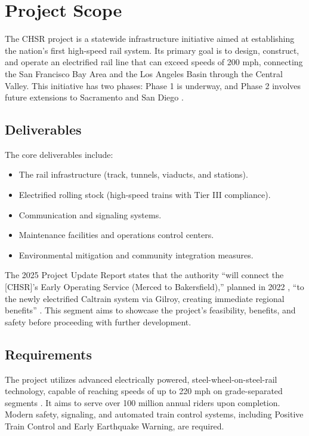 \chapter{Project Scope}
The CHSR project is a statewide infrastructure initiative aimed at establishing the nation's first high-speed rail system. Its primary goal is to design, construct, and operate an electrified rail line that can exceed speeds of 200 mph, connecting the San Francisco Bay Area and the Los Angeles Basin through the Central Valley. This initiative has two phases: Phase 1 is underway, and Phase 2 involves future extensions to Sacramento and San Diego \citep{ureport2023}.

\section{Deliverables}
The core deliverables include:
\begin{itemize}
	\item The rail infrastructure (track, tunnels, viaducts, and stations).
	\item Electrified rolling stock (high-speed trains with Tier III compliance).
	\item Communication and signaling systems.
	\item Maintenance facilities and operations control centers.
	\item Environmental mitigation and community integration measures.
\end{itemize}
The 2025 Project Update Report states that the authority “will connect the [CHSR]’s Early Operating Service (Merced to Bakersfield),” planned in 2022 \citep{plan2022}, “to the newly electrified Caltrain system via Gilroy, creating immediate regional benefits” \citep{ureport2025}. This segment aims to showcase the project’s feasibility, benefits, and safety before proceeding with further development.

\section{Requirements}
The project utilizes advanced electrically powered, steel-wheel-on-steel-rail technology, capable of reaching speeds of up to 220 mph on grade-separated segments \citep{purpose2022}. It aims to serve over 100 million annual riders upon completion. Modern safety, signaling, and automated train control systems, including Positive Train Control and Early Earthquake Warning, are required.

